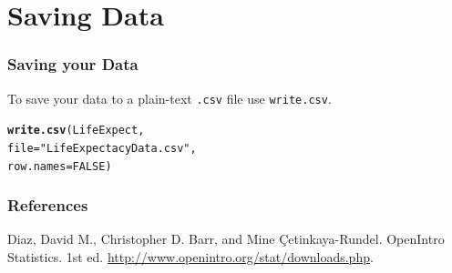 \documentclass{beamer}\usepackage{graphicx, color}
\makeatletter
\newcommand{\hlfunctioncall}[1]{\textcolor[rgb]{0.501960784313725,0,0.329411764705882}{\textbf{#1}}}%
\newcommand{\hlstring}[1]{\textcolor[rgb]{0.6,0.6,1}{#1}}%
\newenvironment{kframe}{%
 \def\at@end@of@kframe{}%
 \ifinner\ifhmode%
  \def\at@end@of@kframe{\end{minipage}}%
  \begin{minipage}{\columnwidth}%
 \fi\fi%
 \def\FrameCommand##1{\hskip\@totalleftmargin \hskip-\fboxsep
 \colorbox{shadecolor}{##1}\hskip-\fboxsep
     \hskip-\linewidth \hskip-\@totalleftmargin \hskip\columnwidth}%
 \MakeFramed {\advance\hsize-\width
   \@totalleftmargin\z@ \linewidth\hsize
   \@setminipage}}%
 {\par\unskip\endMakeFramed%
 \at@end@of@kframe}
\newenvironment{knitrout}{}{} %
\makeatother
\begin{document}
\section{Saving Data}
\begin{frame}[fragile]
  \frametitle{Saving your Data}
  To save your data to a plain-text \texttt{.csv} file use \texttt{write.csv}.
\begin{knitrout}
\color{fgcolor}\begin{kframe}
\begin{alltt}
\hlfunctioncall{write.csv}(LifeExpect, 
            file = \hlstring{"LifeExpectacyData.csv"}, 
            row.names = FALSE)
\end{alltt}
\end{kframe}
\end{knitrout}

\end{frame}


\begin{frame}[allowframebreaks]
  \frametitle{References}
  Diaz, David M., Christopher D. Barr, and Mine \c{C}etinkaya-Rundel. OpenIntro Statistics. 1st ed. \url{http://www.openintro.org/stat/downloads.php}. \\[0.25cm] 
  

\end{frame}
\end{document}
